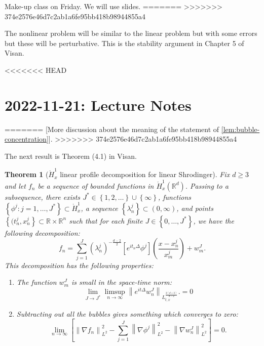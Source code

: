 \documentclass{article}
\newtheorem{theorem}{Theorem}
\def\R{\mathbb{R}} %
\newcommand\norm[1]{\left\lVert#1\right\rVert}
\begin{document}
Make-up class on Friday. We will use slides. 
=======
>>>>>>> 374e2576e46d7c2ab1a6fe95bb418b98944855a4

The nonlinear problem will be similar to the linear problem but with some errors
but these will be perturbative. This is the stability argument in Chapter 5 of
Visan.

<<<<<<< HEAD
\section{2022-11-21: Lecture Notes}
=======
[More discussion about the meaning of the statement of
\cref{lem:bubble-concentration}].
>>>>>>> 374e2576e46d7c2ab1a6fe95bb418b98944855a4

The next result is Theorem (4.1) in Visan.

\begin{theorem}[$\mathring{H}_x^1$ linear profile decomposition for linear Shrodinger]
  \label{thm:H1x-linear-profile-decomposition-for-linear-shrodinger}
  Fix $d \geq 3$ and let $f_{n}$ be a sequence of bounded functions in
  $\mathring{H}_{x}^{1}(\R^d)$. Passing to a subsequence, there exists $J^{*}\in
  \left\{1,2,\ldots\right\}\cup \left\{\infty\right\}$, functions
  $\left\{\phi^{j}: j=1,\ldots,J^{*}\right\}\subset \mathring{H}_{x}^{1}$,  a
  sequence $\left\{\lambda_{n}^{j}\right\}\subset (0,\infty)$, and points
  $\left\{(t_{n}^{j},x_{n}^{j}\right\}\subset \R\times\R^{n}$ such that for each
  finite $J\in \left\{0,\ldots,J^{*}\right\}$, we have the following
  decomposition:
  \begin{equation}\label{eq:linear-shrodinger-profile-decomposition}
    f_{n}= \sum_{j=1}^{J} \left( \lambda_{n}^{j} \right)^{-\frac{d-2}{2}}\left[ e^{it_{n}\Delta}\phi^{j} \right]\left( \frac{x-x_{n}^{j}}{x_{m}^{j}} \right) + w_{m}^{J}.
  \end{equation}
  This decomposition has the following properties:
  \begin{enumerate}
    \item The function $w_{m}^{J}$ is small in the space-time norm:
    \begin{equation*}
      \lim_{J\to J^{*}} \limsup_{n\to\infty} \norm{e^{it\Delta}w_{n}^{J}}_{L_{t,x}^{\frac{2(d+2)}{d-2}}}.
      = 0
    \end{equation*}
    \item Subtracting out all the bubbles gives something which converges to
    zero:
    \begin{equation*}
      \lim_{n\to\infty} \left[ \norm{\nabla f_{n}}_{L^{2}}^{2}- \sum_{j=1}^{J}\norm{\nabla \phi^{j}}_{L^{2}}^{2}- \norm{\nabla w_{n}^{J}}_{L^{2}}^{2}  \right]  = 0.

\end{equation*}
\end{enumerate}
\end{theorem}
\end{document}
